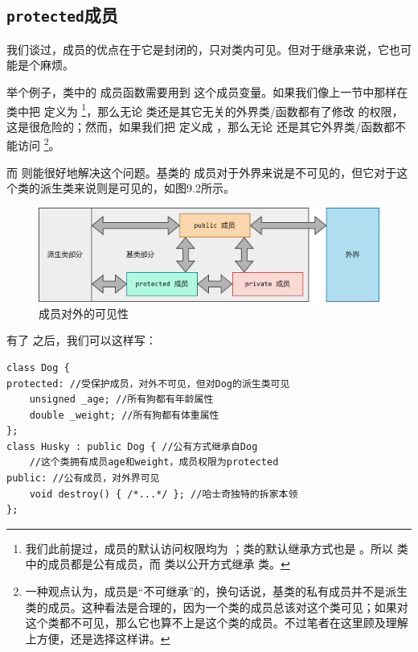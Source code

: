 \subsection*{\texttt{protected}成员}
我们谈过，\lstinline@private@ 成员的优点在于它是封闭的，只对类内可见。但对于继承来说，它也可能是个麻烦。\par
举个例子，\lstinline@Husky@ 类中的 \lstinline@destory@ 成员函数需要用到 \lstinline@weight@ 这个成员变量。如果我们像上一节中那样在 \lstinline@Dog@ 类中把 \lstinline@weight@ 定义为 \lstinline@public@\footnote{我们此前提过，\lstinline@struct@ 成员的默认访问权限均为 \lstinline@public@；\lstinline@struct@ 类的默认继承方式也是 \lstinline@public@。所以 \lstinline@Dog@ 类中的成员都是公有成员，而 \lstinline@Husky@ 类以公开方式继承 \lstinline@Dog@ 类。}，那么无论 \lstinline@Husky@ 类还是其它无关的外界类/函数都有了修改 \lstinline@weight@ 的权限，这是很危险的；然而，如果我们把 \lstinline@weight@ 定义成 \lstinline@private@，那么无论 \lstinline@Husky@ 还是其它外界类/函数都不能访问 \lstinline@weight@\footnote{一种观点认为，\lstinline@private@ 成员是``不可继承''的，换句话说，基类的私有成员并不是派生类的成员。这种看法是合理的，因为一个类的成员总该对这个类可见；如果对这个类都不可见，那么它也算不上是这个类的成员。不过笔者在这里顾及理解上方便，还是选择这样讲。}。\par
而 \lstinline@protected@ 则能很好地解决这个问题。基类的 \lstinline@protected@ 成员对于外界来说是不可见的，但它对于这个类的派生类来说则是可见的，如图9.2所示。\par
\begin{figure}[htbp]
    \centering
    \includegraphics[width=\textwidth]{../images/generalized_parts/09_protected_members.drawio.png}
    \caption{\lstinline@protected@ 成员对外的可见性}
\end{figure}
有了 \lstinline@protected@ 之后，我们可以这样写：
\begin{lstlisting}
class Dog {
protected: //受保护成员，对外不可见，但对Dog的派生类可见
    unsigned _age; //所有狗都有年龄属性
    double _weight; //所有狗都有体重属性
};
class Husky : public Dog { //公有方式继承自Dog
    //这个类拥有成员age和weight，成员权限为protected
public: //公有成员，对外界可见
    void destroy() { /*...*/ }; //哈士奇独特的拆家本领
};
\end{lstlisting}\par
